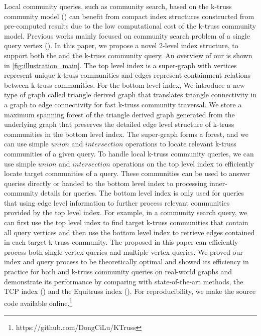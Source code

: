 Local community queries, such as community search, based on the k-truss community model (\cite{huang2014querying}) can benefit from compact index structures constructed from pre-computed results due to the low computational cost of the k-truss community model. Previous works mainly focused on community search problem of a single query vertex (\cite{huang2014querying, akbas2017truss}). In this paper, we propose a novel 2-level index structure, to support both the \toplevelprob{} and the \bottomlevelprob{} k-truss community query. An overview of our \twolevelindex{} is shown in \autoref{fig:illustration_main}. The top level index is a super-graph with vertices represent unique k-truss communities and edges represent containment relations between k-truss communities. For the bottom level index, We introduce a new type of graph called triangle derived graph that translates triangle connectivity in a graph to edge connectivity for fast k-truss community traversal. We store a maximum spanning forest of the triangle derived graph generated from the underlying graph that preserves the detailed edge level structure of k-truss communities in the bottom level index. 
The super-graph forms a forest, and we can use simple $union$ and $intersection$ operations to locate relevant k-truss communities of a given query. 
To handle local k-truss community queries, we can use simple $union$ and $intersection$ operations on the top level index to efficiently locate target communities of a query. These communities can be used to answer \toplevelprob{} queries directly or handed to the bottom level index to processing inner-community details for \bottomlevelprob{} queries. The bottom level index is only used for \bottomlevelprob{} queries that using edge level information to further process relevant communities provided by the top level index. For example, in a community search query, we can first use the top level index to find target k-truss communities that contain all query vertices and then use the bottom level index to retrieve edges contained in each target k-truss community. The \twolevelindex{} proposed in this paper can efficiently process both single-vertex queries and multiple-vertex queries. We proved our index and query process to be theoretically optimal and showed its efficiency in practice for both \toplevelprob{} and \bottomlevelprob{} k-truss community queries on real-world graphs and demonstrate its performance by comparing with state-of-the-art methods, the TCP index (\cite{huang2014querying}) and the Equitruss index (\cite{akbas2017truss}). For reproducibility, we make the source code available online.\footnote{https://github.com/DongCiLu/KTruss}

